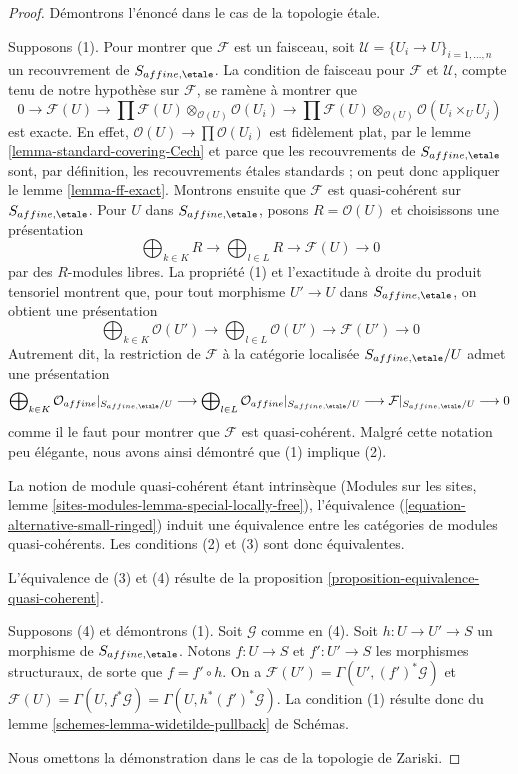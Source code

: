 \begin{proof}
Démontrons l'énoncé dans le cas de la topologie \'etale.

\medskip\noindent
Supposons (1). Pour montrer que $\mathcal{F}$ est un faisceau, soit
$\mathcal{U} = \{U_i \to U\}_{i = 1, \ldots, n}$ un recouvrement de
$S_{affine, \etale}$. La condition de faisceau pour $\mathcal{F}$ et
$\mathcal{U}$, compte tenu de notre hypothèse sur $\mathcal{F}$, se ramène à
montrer que
$$
0 \to \mathcal{F}(U) \to
\prod \mathcal{F}(U) \otimes_{\mathcal{O}(U)} \mathcal{O}(U_i) \to
\prod \mathcal{F}(U) \otimes_{\mathcal{O}(U)} \mathcal{O}(U_i \times_U U_j)
$$
est exacte. En effet, $\mathcal{O}(U) \to \prod \mathcal{O}(U_i)$ est
fidèlement plat, par le lemme \ref{lemma-standard-covering-Cech} et parce que
les recouvrements de $S_{affine, \etale}$ sont, par définition, les
recouvrements \'etales standards ; on peut donc appliquer le lemme
\ref{lemma-ff-exact}.
Montrons ensuite que $\mathcal{F}$ est quasi-cohérent sur
$S_{affine, \etale}$. Pour $U$ dans $S_{affine, \etale}$, posons
$R = \mathcal{O}(U)$ et choisissons une présentation
$$
\bigoplus\nolimits_{k \in K} R
\longrightarrow
\bigoplus\nolimits_{l \in L} R
\longrightarrow
\mathcal{F}(U)
\longrightarrow 0
$$
par des $R$-modules libres. La propriété (1) et l'exactitude à droite du
produit tensoriel montrent que, pour tout morphisme $U' \to U$ dans
$S_{affine, \etale}$, on obtient une présentation
$$
\bigoplus\nolimits_{k \in K} \mathcal{O}(U')
\longrightarrow
\bigoplus\nolimits_{l \in L} \mathcal{O}(U')
\longrightarrow
\mathcal{F}(U')
\longrightarrow 0
$$
Autrement dit, la restriction de $\mathcal{F}$ à la catégorie localisée
$S_{affine, \etale}/U$ admet une présentation
$$
\bigoplus\nolimits_{k \in K} \mathcal{O}_{affine}|_{S_{affine, \etale}/U}
\longrightarrow
\bigoplus\nolimits_{l \in L} \mathcal{O}_{affine}|_{S_{affine, \etale}/U}
\longrightarrow
\mathcal{F}|_{S_{affine, \etale}/U}
\longrightarrow 0
$$
comme il le faut pour montrer que $\mathcal{F}$ est quasi-cohérent.
Malgré cette notation peu élégante, nous avons ainsi démontré que (1)
implique (2).

\medskip\noindent
La notion de module quasi-cohérent étant intrinsèque (Modules sur les sites,
lemme \ref{sites-modules-lemma-special-locally-free}), l'équivalence
(\ref{equation-alternative-small-ringed}) induit une équivalence entre les
catégories de modules quasi-cohérents. Les conditions (2) et (3) sont donc
équivalentes.

\medskip\noindent
L'équivalence de (3) et (4) résulte de la
proposition \ref{proposition-equivalence-quasi-coherent}.

\medskip\noindent
Supposons (4) et démontrons (1). Soit $\mathcal{G}$ comme en (4).
Soit $h : U \to U' \to S$ un morphisme de $S_{affine, \etale}$.
Notons $f : U \to S$ et $f' : U' \to S$ les morphismes structuraux, de sorte
que $f = f' \circ h$. On a
$\mathcal{F}(U') = \Gamma(U', (f')^*\mathcal{G})$ et
$\mathcal{F}(U) = \Gamma(U, f^*\mathcal{G}) = \Gamma(U, h^*(f')^*\mathcal{G})$.
La condition (1) résulte donc du lemme
\ref{schemes-lemma-widetilde-pullback} de Schémas.

\medskip\noindent
Nous omettons la démonstration dans le cas de la topologie de Zariski.
\end{proof}
